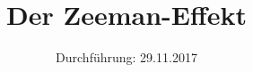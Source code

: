 

\subject{V 27}
\title{Der Zeeman-Effekt}
\date{
  Durchführung: 29.11.2017
  \hspace{3em}
}



\maketitle
\thispagestyle{empty}
\tableofcontents
\newpage
\setcounter{page}{1}






\printbibliography


